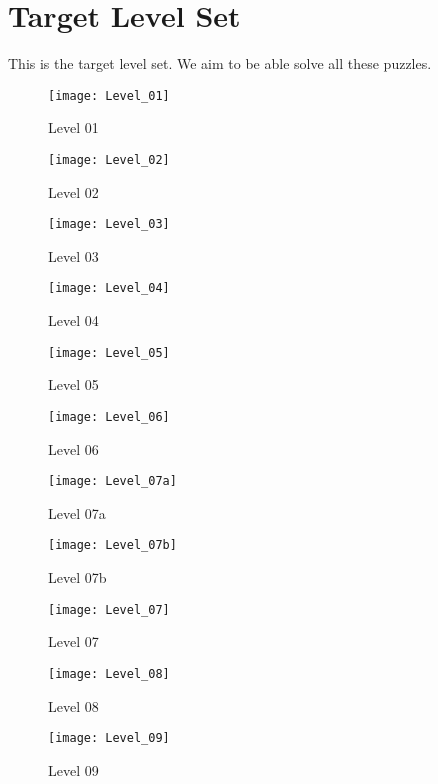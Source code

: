 \chapter{Target Level Set}

This is the target level set. We aim to be able solve all these puzzles.

\begin{figure}
  \centering \texttt{[image: Level\_01]} \caption{Level
    01} \label{fig:level01-pic} \end{figure}

\begin{figure}
  \centering \texttt{[image: Level\_02]} \caption{Level
    02} \label{fig:level02-pic} \end{figure}
\begin{figure}
  \centering \texttt{[image: Level\_03]} \caption{Level
    03} \label{fig:level03-pic} \end{figure}
\begin{figure}
  \centering \texttt{[image: Level\_04]} \caption{Level
    04} \label{fig:level04-pic} \end{figure}
\begin{figure}
  \centering \texttt{[image: Level\_05]} \caption{Level
    05} \label{fig:level05-pic} \end{figure}
\begin{figure}
  \centering \texttt{[image: Level\_06]} \caption{Level
    06} \label{fig:level06-pic} \end{figure}
\begin{figure}
  \centering \texttt{[image: Level\_07a]} \caption{Level
    07a} \label{fig:level07a-pic} \end{figure}
\begin{figure}
  \centering \texttt{[image: Level\_07b]} \caption{Level
    07b} \label{fig:level07b-pic} \end{figure}
\begin{figure}
  \centering \texttt{[image: Level\_07]} \caption{Level
    07} \label{fig:level07-pic} \end{figure}
\begin{figure}
  \centering \texttt{[image: Level\_08]} \caption{Level
    08} \label{fig:level08-pic} \end{figure}
\begin{figure}
  \centering \texttt{[image: Level\_09]} \caption{Level
    09} \label{fig:level09-pic} \end{figure}
